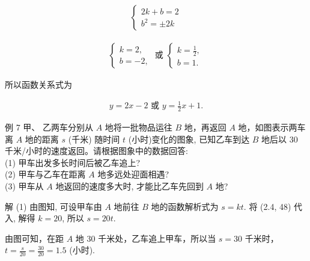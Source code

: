 \documentclass[10pt]{article}
\begin{document}
\begin{align*}
\left\{\begin{array}{l}
2 k+b=2 \\
b^{2}= \pm 2 k
\end{array}\right.
\end{align*}

\begin{align*}
\left\{\begin{array} { l } 
{ k = 2 , } \\
{ b = - 2 , }
\end{array} \text { 或 } \left\{\begin{array}{l}
k=\frac{1}{2}, \\
b=1 .
\end{array}\right.\right.
\end{align*}

所以函数关系式为

\begin{align*}
y=2 x-2 \text { 或 } y=\frac{1}{2} x+1 .
\end{align*}

例 7 甲、 乙两车分别从 $A$ 地将一批物品运往 $B$ 地，再返回 $A$ 地，如图表示两车离 $A$ 地的距离 $s$ (千米) 随时间 $t$ (小时)变化的图象, 已知乙车到达 $B$ 地后以 30 千米/小时的速度返回。请根据图象中的数据回答:\\
(1) 甲车出发多长时间后被乙车追上?\\
(2) 甲车与乙车在距离 $A$ 地多远处迎面相遇?\\
(3) 甲车从 $A$ 地返回的速度多大时, 才能比乙车先回到 $A$ 地?

解 (1) 由图知, 可设甲车由 $A$ 地前往 $B$ 地的函数解析式为 $s=k t$. 将 (2.4, 48) 代入, 解得 $k=20$, 所以 $s=20 t$.

由图可知，在距 $A$ 地 30 千米处，乙车追上甲车，所以当 $s=30$ 千米时， $t=\frac{s}{20}=\frac{30}{20}=1.5$ (小时).
\end{document}

